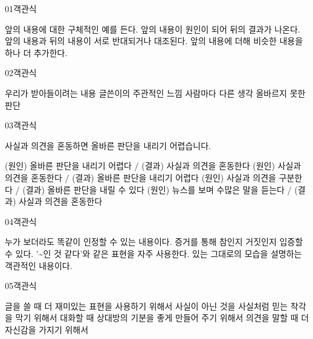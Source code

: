 \documentclass[fs95,seriesFre]{korfarm-base}
\begin{document}
\begin{kfQBlock}{01}{객관식}
\begin{kfChoices}
\kfChoice 앞의 내용에 대한 구체적인 예를 든다.
\kfChoice 앞의 내용이 원인이 되어 뒤의 결과가 나온다.
\kfChoice 앞의 내용과 뒤의 내용이 서로 반대되거나 대조된다.
\kfChoice 앞의 내용에 더해 비슷한 내용을 하나 더 추가한다.
\end{kfChoices}
\end{kfQBlock}
\begin{kfQBlock}{02}{객관식}
\begin{kfChoices}
\kfChoice 우리가 받아들이려는 내용
\kfChoice 글쓴이의 주관적인 느낌
\kfChoice 사람마다 다른 생각
\kfChoice 올바르지 못한 판단
\end{kfChoices}
\end{kfQBlock}
\begin{kfQBlock}{03}{객관식}
\begin{kfEvidence}사실과 의견을 혼동하면 올바른 판단을 내리기 어렵습니다.\end{kfEvidence}
\begin{kfChoices}
\kfChoice (원인) 올바른 판단을 내리기 어렵다 / (결과) 사실과 의견을 혼동한다
\kfChoice (원인) 사실과 의견을 혼동한다 / (결과) 올바른 판단을 내리기 어렵다
\kfChoice (원인) 사실과 의견을 구분한다 / (결과) 올바른 판단을 내릴 수 있다
\kfChoice (원인) 뉴스를 보며 수많은 말을 듣는다 / (결과) 사실과 의견을 혼동한다
\end{kfChoices}
\end{kfQBlock}
\begin{kfQBlock}{04}{객관식}
\begin{kfChoices}
\kfChoice 누가 보더라도 똑같이 인정할 수 있는 내용이다.
\kfChoice 증거를 통해 참인지 거짓인지 입증할 수 있다.
\kfChoice '\textasciitilde{}인 것 같다'와 같은 표현을 자주 사용한다.
\kfChoice 있는 그대로의 모습을 설명하는 객관적인 내용이다.
\end{kfChoices}
\end{kfQBlock}
\begin{kfQBlock}{05}{객관식}
\begin{kfChoices}
\kfChoice 글을 쓸 때 더 재미있는 표현을 사용하기 위해서
\kfChoice 사실이 아닌 것을 사실처럼 믿는 착각을 막기 위해서
\kfChoice 대화할 때 상대방의 기분을 좋게 만들어 주기 위해서
\kfChoice 의견을 말할 때 더 자신감을 가지기 위해서
\end{kfChoices}
\end{kfQBlock}
\end{document}

